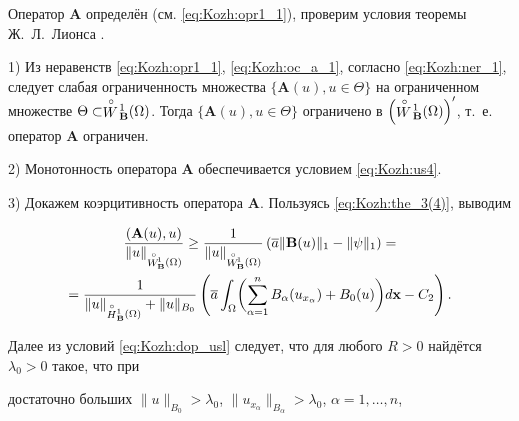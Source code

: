 Оператор $\mathbf{A}$ определён (см. \eqref{eq:Kozh:opr1_1}), проверим условия теоремы Ж.~Л.~Лионса \cite[гл. II, \S~2, теорема 2.1]{KozhKhad:bib:Lions}.



\smallskip



1) Из неравенств \eqref{eq:Kozh:opr1_1}, \eqref{eq:Kozh:oc_a_1}, согласно \eqref{eq:Kozh:ner_1}, следует слабая ограниченность множества $\{\mathbf{A}(u), u\in \Theta\}$ на ограниченном множестве $\Theta\subset\stackrel {\circ}

{W}\!_{\bf B}^{1}(\Omega)$. Тогда $\{\mathbf{A}(u), u\in \Theta\}$ ограничено в $\left(\stackrel {\circ}

{W}\!_{\bf B}^{1}(\Omega)\right)'$, т.~е. оператор $\mathbf{A}$ ограничен.



\smallskip



2) Монотонность оператора $\mathbf{A}$ обеспечивается условием \eqref{eq:Kozh:us4}.



\smallskip



3) Докажем коэрцитивность оператора $\mathbf{A}$. Пользуясь \eqref{eq:Kozh:the_3(4)}, выводим

\begin{multline}\label{eq:Kozh:the_3(5)}

\frac{(\mathbf{A}(u),u)}{\|u\|_{

\stackrel {\circ}

{W}\!_{\bf B}^{1}(\Omega)}}\geq \frac{1}{\|u\|_{

\stackrel {\circ}

{W}\!_{\bf B}^{1}(\Omega)}}\left(\overline{a}\|\mathbf{B}(u)\|_{1}-\|\psi\|_{1}\right)=

\\

=\frac{1}{\|u\|_{\stackrel {\circ}

{H}{}_{\bf B}^1(\Omega)}+\|u\|_{B_0}}\left({\overline{a}}\int_{\Omega}\biggl(\sum_{\alpha=1}^nB_\alpha(u_{x_\alpha})+B_0(u)\biggr)d{\bf x}-C_2\right).

\end{multline}

Далее из условий \eqref{eq:Kozh:dop_usl} следует, что для любого $R>0$ найдётся $\lambda_0>0$ такое, что при

достаточно больших $\|u\|_{B_0}>\lambda_0$, $\|u_{x_{\alpha}}\|_{B_{\alpha}}>\lambda_0$, $\alpha={1,\ldots,n}$,

